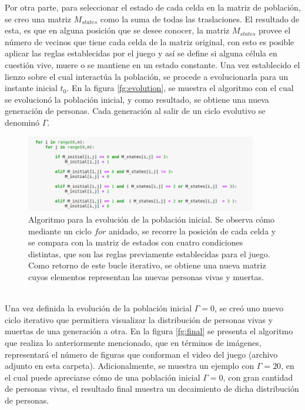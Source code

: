 \documentclass[11pt]{iopart}
\begin{document}
Por otra parte, para seleccionar el estado de cada celda en la matriz de población, se creo una matriz $M_{states}$ como la suma de todas las traslaciones. El resultado de esta, es que en  alguna posición que se desee conocer, la matriz $M_{states}$ provee el número de vecinos que tiene cada celda de la matriz original, con esto es posible aplicar las reglas establecidas por el juego y así se define si alguna célula en cuestión vive, muere o se mantiene en un estado constante. Una vez establecido el lienzo sobre el cual interactúa la población, se procede a evolucionarla para un instante inicial $t_{0}$. En la figura \eqref{fg:evolution}, se muestra el algoritmo con el cual se evolucionó la población inicial, y como resultado, se obtiene una nueva generación de personas. Cada generación al salir de un ciclo evolutivo se denominó $\Gamma$.
%
\begin{figure}[h!]
\centering
\includegraphics[width = 0.9\textwidth]{Figs/evolution}
\caption{Algoritmo para la evolución de la población inicial. Se observa cómo mediante un ciclo $for$ anidado, se recorre la posición de cada celda y se compara con la matriz de estados con cuatro condiciones distintas, que son las reglas previamente establecidas para el juego. Como retorno de este bucle iterativo, se obtiene una nueva matriz cuyos elementos representan las nuevas personas vivas y muertas. \label{fg:evolution}}
\end{figure}
\\ 
%
Una vez definida la evolución de la población inicial $\Gamma = 0$, se creó uno nuevo ciclo iterativo que permitiera visualizar la distribución de personas vivas y muertas de una generación a otra. En la figura \eqref{fg:final} se  presenta el algoritmo que realiza lo anteriormente mencionado, que en términos de imágenes, representará el número de figuras que conforman el video del juego (archivo adjunto en esta carpeta). Adicionalmente, se muestra un ejemplo con $\Gamma = 20$, en el cual puede apreciarse cómo de una población inicial $\Gamma = 0$, con gran cantidad de personas vivas, el resultado final muestra un decaimiento de dicha distribución de personas.
%
\end{document}
